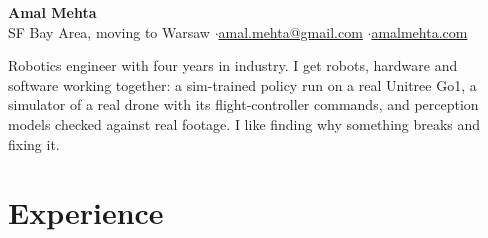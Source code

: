 \documentclass[10pt]{article}
\begin{document}
\fontsize{9.8}{10.8}\selectfont

\begin{center}
{\LARGE\bfseries Amal Mehta}\\[3pt]
SF Bay Area, moving to Warsaw \quad$\cdot$\quad \href{mailto:amal.mehta@gmail.com}{amal.mehta@gmail.com} \quad$\cdot$\quad \href{https://amalmehta.com/}{amalmehta.com}
\end{center}

Robotics engineer with four years in industry. I get robots, hardware and software working together: a sim-trained policy run on a real Unitree Go1, a simulator of a real drone with its flight-controller commands, and perception models checked against real footage. I like finding why something breaks and fixing it.

\section*{Experience}
\end{document}
